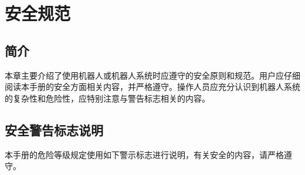 \documentclass[a4paper,11pt,english,openany,oneside]{sphinxmanual}
\begin{document}
\chapter{安全规范}
\label{\detokenize{05 _u5b89_u5168_u89c4_u8303:id1}}\label{\detokenize{05 _u5b89_u5168_u89c4_u8303:id2}}\label{\detokenize{05 _u5b89_u5168_u89c4_u8303::doc}}

\section{简介}
\label{\detokenize{05 _u5b89_u5168_u89c4_u8303:id3}}
\sphinxAtStartPar
本章主要介绍了使用机器人或机器人系统时应遵守的安全原则和规范。用户应仔细阅读本手册的安全方面相关内容，并严格遵守。操作人员应充分认识到机器人系统的复杂性和危险性，应特别注意与警告标志相关的内容。


\section{安全警告标志说明}
\label{\detokenize{05 _u5b89_u5168_u89c4_u8303:id4}}
\sphinxAtStartPar
本手册的危险等级规定使用如下警示标志进行说明，有关安全的内容，请严格遵守。
\end{document}
